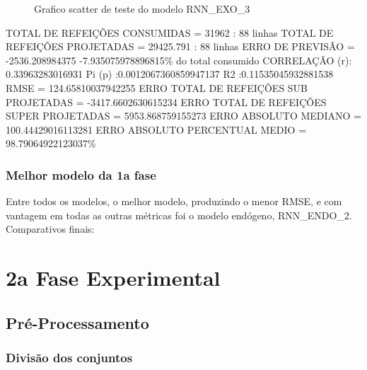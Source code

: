\documentclass[	12pt, Times, openright, twoside, a4paper, english, brazil]{abntex2}
\begin{document}
                \begin{figure}[!ht]
                  \caption{Grafico scatter de teste do modelo RNN\_EXO\_3 \label{fig:case3_rnn_exo_3_test_scatter} }
                \end{figure}
                TOTAL DE REFEIÇÕES CONSUMIDAS = 31962 : 88 linhas\newline
                TOTAL DE REFEIÇÕES PROJETADAS = 29425.791 : 88 linhas\newline
                ERRO DE PREVISÃO = -2536.208984375 -7.935075978896815\% do total consumido\newline
                CORRELAÇÃO (r): 0.33963283016931 Pi (p) :0.0012067360859947137 R2 :0.11535045932881538\newline
                RMSE = 124.65810037942255\newline
                ERRO TOTAL DE REFEIÇÕES SUB PROJETADAS = -3417.6602630615234\newline
                ERRO TOTAL DE REFEIÇÕES SUPER PROJETADAS = 5953.868759155273\newline
                ERRO ABSOLUTO MEDIANO = 100.44429016113281\newline
                ERRO ABSOLUTO PERCENTUAL MEDIO = 98.79064922123037\%\newline

    	    \subsubsection{Melhor modelo da 1a fase}
                Entre todos os modelos, o melhor modelo, produzindo o menor RMSE, e com vantagem em todas as outras métricas foi o modelo endógeno, RNN\_ENDO\_2.
                Comparativos finais:

    \section{2a Fase Experimental}
	    \subsection{Pré-Processamento}
    	    \subsubsection{Divisão dos conjuntos}
    	        
\end{document}
